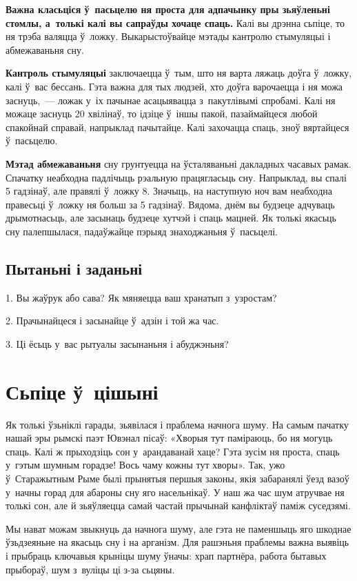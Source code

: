 \textbf{Важна класьціся ў~пасьцелю ня проста для адпачынку пры зьяўленьні стомлы, а~толькі калі вы сапраўды хочаце спаць.} Калі вы дрэнна сьпіце, то ня трэба валяцца ў~ложку. Выкарыстоўвайце мэтады кантролю стымуляцыі і абмежаваньня сну.

\textbf{Кантроль стымуляцыі} заключаецца ў~тым, што ня варта ляжаць доўга ў~ложку, калі ў~вас бессань. Гэта важна для тых людзей, хто доўга варочаецца і ня можа заснуць,~--- ложак у~іх пачынае асацыявацца з~пакутлівымі спробамі. Калі ня можаце заснуць 20 хвілінаў, то ідзіце ў~іншы пакой, пазаймайцеся любой спакойнай справай, напрыклад пачытайце. Калі захочацца спаць, зноў вяртайцеся ў~пасьцелю.

\textbf{Мэтад абмежаваньня} сну грунтуецца на ўсталяваньні дакладных часавых рамак. Спачатку неабходна падлічыць рэальную працягласьць сну. Напрыклад, вы спалі 5 гадзінаў, але правялі ў~ложку 8. Значыць, на наступную ноч вам неабходна правесьці ў~ложку ня больш за 5 гадзінаў. Вядома, днём вы будзеце адчуваць дрымотнасьць, але засынаць будзеце хутчэй і спаць мацней. Як толькі якасьць сну палепшылася, падаўжайце пэрыяд знаходжаньня ў~пасьцелі.

\subsection*{Пытаньні і заданьні}

1. Вы жаўрук або сава? Як мяняецца ваш хранатып з~узростам?

2. Прачынайцеся і засынайце ў~адзін і той жа час.

3. Ці ёсьць у~вас рытуалы засынаньня і абуджэньня?


\section{Сьпіце ў~цішыні}

Як толькі ўзьніклі гарады, зьявілася і праблема начнога шуму. На самым пачатку нашай эры рымскі паэт Ювэнал пісаў: «Хворыя тут паміраюць, бо ня могуць спаць. Калі ж прыходзіць сон у~арандаванай хаце? Гэта зусім ня проста, спаць у~гэтым шумным горадзе! Вось чаму кожны тут хворы». Так, ужо ў~Старажытным Рыме былі прынятыя першыя законы, якія забаранялі ўезд вазоў у~начны горад для абароны сну яго насельнікаў. У наш жа час шум атручвае ня толькі сон, але й зьяўляецца самай частай прычынай канфліктаў паміж суседзямі.

Мы нават можам звыкнуць да начнога шуму, але гэта не паменшыць яго шкоднае ўзьдзеяньне на якасьць сну і на арганізм. Для рашэньня праблемы важна выявіць і прыбраць ключавыя крыніцы шуму ўначы: храп партнёра, работа бытавых прыбораў, шум з~вуліцы ці з-за сьцяны.

